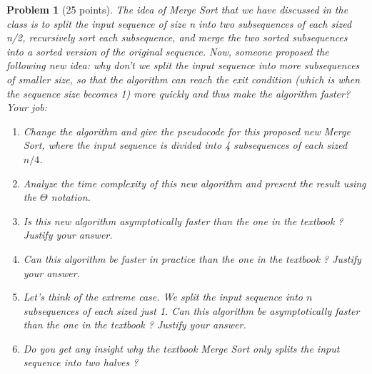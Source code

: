 \documentclass[11pt]{article}
\newtheorem{problem}{Problem}
\begin{document}
\begin{problem}[25 points]
\label{prob:7}
The idea of Merge Sort that we have discussed in the class is to split the input
sequence of size n into two subsequences of each sized n/2, recursively sort each subsequence, and merge
the two sorted subsequences into a sorted version of the original sequence. Now, someone proposed the
following new idea: why don’t we split the input sequence into more subsequences of smaller size, so that
the algorithm can reach the exit condition (which is when the sequence size becomes 1) more quickly and
thus make the algorithm faster? Your job:

\begin{enumerate}
\item  Change the algorithm and give the pseudocode for this proposed new Merge Sort, where the input
sequence is divided into 4 subsequences of each sized $n/4$.

\item Analyze the time complexity of this new algorithm and present the result using the $\Theta$ notation.

\item  Is this new algorithm asymptotically faster than the one in the textbook ? Justify your answer.

\item  Can this algorithm be faster in practice than the one in the textbook ? Justify your answer.

\item  Let’s think of the extreme case. We split the input sequence into $n$ subsequences of each sized just 1.
Can this algorithm be asymptotically faster than the one in the textbook ? Justify your answer.

\item  Do you get any insight why the textbook Merge Sort only splits the input sequence into two halves ?
\end{enumerate}
\end{problem}


\end{document}
